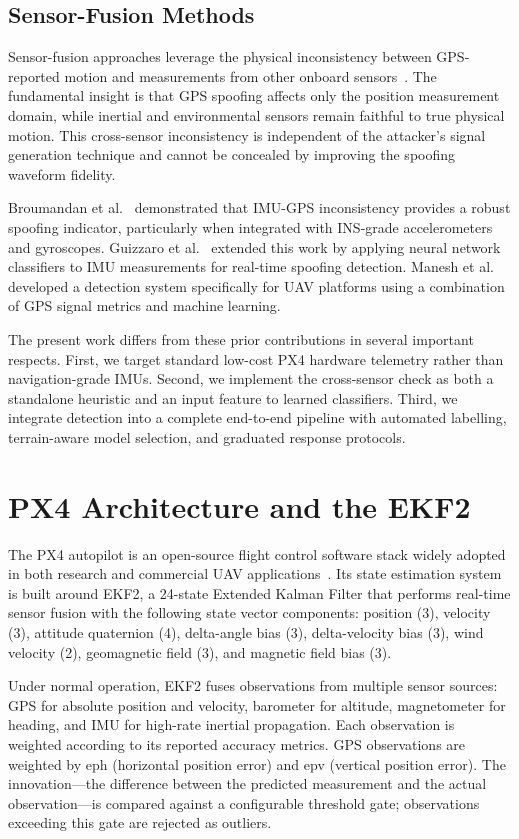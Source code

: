 \subsection{Sensor-Fusion Methods}

Sensor-fusion approaches leverage the physical inconsistency between GPS-reported motion and measurements from other onboard sensors~\cite{Broumandan2020}. The fundamental insight is that GPS spoofing affects only the position measurement domain, while inertial and environmental sensors remain faithful to true physical motion. This cross-sensor inconsistency is independent of the attacker's signal generation technique and cannot be concealed by improving the spoofing waveform fidelity.

Broumandan et al.~\cite{Broumandan2020} demonstrated that IMU-GPS inconsistency provides a robust spoofing indicator, particularly when integrated with INS-grade accelerometers and gyroscopes. Guizzaro et al.~\cite{Guizzaro2022} extended this work by applying neural network classifiers to IMU measurements for real-time spoofing detection. Manesh et al.~\cite{Manesh2019} developed a detection system specifically for UAV platforms using a combination of GPS signal metrics and machine learning.

The present work differs from these prior contributions in several important respects. First, we target standard low-cost PX4 hardware telemetry rather than navigation-grade IMUs. Second, we implement the cross-sensor check as both a standalone heuristic and an input feature to learned classifiers. Third, we integrate detection into a complete end-to-end pipeline with automated labelling, terrain-aware model selection, and graduated response protocols.

\section{PX4 Architecture and the EKF2}

The PX4 autopilot is an open-source flight control software stack widely adopted in both research and commercial UAV applications~\cite{PX4Docs}. Its state estimation system is built around EKF2, a 24-state Extended Kalman Filter that performs real-time sensor fusion with the following state vector components: position (3), velocity (3), attitude quaternion (4), delta-angle bias (3), delta-velocity bias (3), wind velocity (2), geomagnetic field (3), and magnetic field bias (3).

Under normal operation, EKF2 fuses observations from multiple sensor sources: GPS for absolute position and velocity, barometer for altitude, magnetometer for heading, and IMU for high-rate inertial propagation. Each observation is weighted according to its reported accuracy metrics. GPS observations are weighted by eph (horizontal position error) and epv (vertical position error). The innovation---the difference between the predicted measurement and the actual observation---is compared against a configurable threshold gate; observations exceeding this gate are rejected as outliers.

